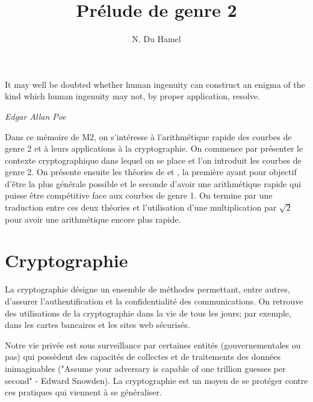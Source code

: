 \documentclass[a4paper]{article}
\theoremstyle{definition}
\theoremstyle{remark}
\numberwithin{equation}{section}
\begin{document}
\title{Prélude de genre 2}
\author{N. Du Hamel}
\maketitle


\epigraph{It may well be doubted whether human ingenuity can construct an enigma of the kind which human ingenuity may not, by proper application, resolve.}{\textit{Edgar Allan Poe}}

Dans ce mémoire de M2, on s'intéresse à l'arithmétique rapide des courbes de genre 2 et à leurs applications à la cryptographie. On commence par présenter le contexte cryptographique dans lequel on se place et l'on introduit les courbes de genre 2. On présente ensuite les théories de \citet{cassels-Flynn} et \citet{gaudry}, la première ayant pour objectif d'être la plus générale possible et le seconde d'avoir une arithmétique rapide qui puisse être compétitive face aux courbes de genre 1. On termine par une traduction entre ces deux théories et l'utilisation d'une multiplication par $\sqrt{2}$ pour avoir une arithmétique encore plus rapide.

\section{Cryptographie}

La cryptographie désigne un ensemble de méthodes permettant, entre autres, d'assurer l'authentification et la confidentialité des communications. On retrouve des utilisations de la cryptographie dans la vie de tous les jours; par exemple, dans les cartes bancaires et les sites web sécurisés.

Notre vie privée est sous surveillance par certaines entités (gouvernementales ou pas) qui possèdent des capacités de collectes et de traitements des données inimaginables ("Assume your adversary is capable of one trillion guesses per second" - Edward Snowden).
La cryptographie est un moyen de se protéger contre ces pratiques qui viennent à se généraliser.
\end{document}
